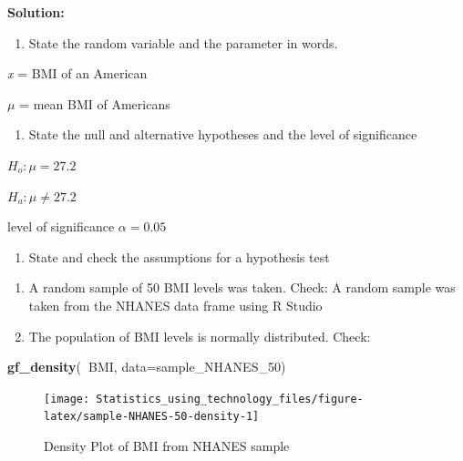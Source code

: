 \documentclass[
]{book}
\newenvironment{Shaded}{\begin{snugshade}}{\end{snugshade}}
\newcommand{\DataTypeTok}[1]{\textcolor[rgb]{0.13,0.29,0.53}{#1}}
\newcommand{\DecValTok}[1]{\textcolor[rgb]{0.00,0.00,0.81}{#1}}
\newcommand{\KeywordTok}[1]{\textcolor[rgb]{0.13,0.29,0.53}{\textbf{#1}}}
\newcommand{\NormalTok}[1]{#1}
\newcommand{\OperatorTok}[1]{\textcolor[rgb]{0.81,0.36,0.00}{\textbf{#1}}}
\providecommand{\tightlist}{%
  \setlength{\itemsep}{0pt}\setlength{\parskip}{0pt}}
\begin{document}
\textbf{Solution:}

\begin{enumerate}
\def\labelenumi{\arabic{enumi}.}
\tightlist
\item
  State the random variable and the parameter in words.
\end{enumerate}

\emph{x} = BMI of an American

\(\mu\) = mean BMI of Americans

\begin{enumerate}
\def\labelenumi{\arabic{enumi}.}
\setcounter{enumi}{1}
\tightlist
\item
  State the null and alternative hypotheses and the level of significance
\end{enumerate}

\(H_o:\mu=27.2\)

\(H_a:\mu\ne 27.2\)

level of significance \(\alpha=0.05\)

\begin{enumerate}
\def\labelenumi{\arabic{enumi}.}
\setcounter{enumi}{2}
\tightlist
\item
  State and check the assumptions for a hypothesis test
\end{enumerate}

\begin{enumerate}
\def\labelenumi{\alph{enumi}.}
\item
  A random sample of 50 BMI levels was taken. Check: A random sample was taken from the NHANES data frame using R Studio
\item
  The population of BMI levels is normally distributed. Check:
\end{enumerate}



\begin{Shaded}
\begin{Highlighting}[]
\KeywordTok{gf_density}\NormalTok{(}\OperatorTok{~}\NormalTok{BMI, }\DataTypeTok{data=}\NormalTok{sample_NHANES_}\DecValTok{50}\NormalTok{)}
\end{Highlighting}
\end{Shaded}

\begin{figure}
\texttt{[image: Statistics\_using\_technology\_files/figure-latex/sample-NHANES-50-density-1]} \caption{Density Plot of BMI from NHANES sample}\label{fig:sample-NHANES-50-density}
\end{figure}
\end{document}
